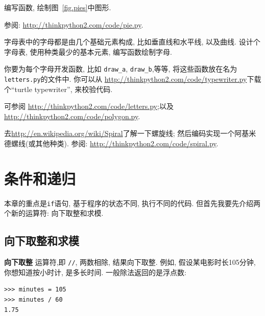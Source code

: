\documentclass[10pt]{book}
\begin{document}
\begin{exercise}

编写函数, 绘制图~\ref{fig.pies}中图形. 

参阅: \url{http://thinkpython2.com/code/pie.py}.

\end{exercise}

\begin{exercise}

字母表中的字母都是由几个基础元素构成, 比如垂直线和水平线, 以及曲线. 
设计个字母表, 使用种类最少的基本元素, 编写函数绘制字母. 

你要为每个字母开发函数, 比如 \verb"draw_a", \verb"draw_b",等等, 
将这些函数放在名为{\tt letters.py}的文件中. 
你可以从 \url{http://thinkpython2.com/code/typewriter.py}下载个``turtle typewriter'', 
来校验代码. 

可参阅 \url{http://thinkpython2.com/code/letters.py};以及
\url{http://thinkpython2.com/code/polygon.py}.

\end{exercise}

\begin{exercise}

去\url{http://en.wikipedia.org/wiki/Spiral}了解一下螺旋线;
然后编码实现一个阿基米德螺线(或其他种类). 
参阅: \url{http://thinkpython2.com/code/spiral.py}.

\end{exercise}


\chapter{条件和递归}

本章的重点是{\tt if}语句, 
基于程序的状态不同, 执行不同的代码. 
但首先我要先介绍两个新的运算符: 向下取整和求模. 

\section{向下取整和求模}

{\bf 向下取整} 运算符,即 \verb"//", 
两数相除, 结果向下取整. 
例如, 假设某电影时长105分钟, 你想知道按小时计, 是多长时间. 
一般除法返回的是浮点数:

\begin{verbatim}
>>> minutes = 105
>>> minutes / 60
1.75
\end{verbatim}
\end{document}
